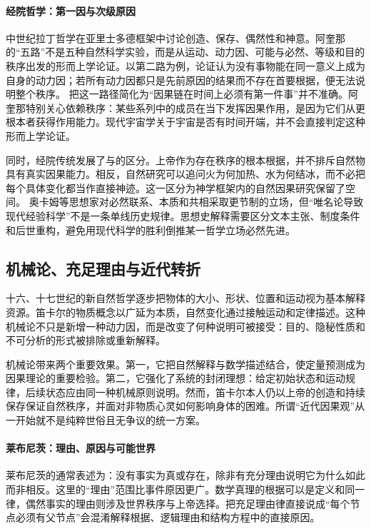 \paragraph{经院哲学：第一因与次级原因}

中世纪拉丁哲学在亚里士多德框架中讨论创造、保存、偶然性和神意。阿奎那的“五路”不是五种自然科学实验，而是从运动、动力因、可能与必然、等级和目的秩序出发的形而上学论证\parencite{aquinasST}。以第二路为例，论证认为没有事物能在同一意义上成为自身的动力因；若所有动力因都只是先前原因的结果而不存在首要根据，便无法说明整个秩序。
把这一路径简化为“因果链在时间上必须有第一件事”并不准确。阿奎那特别关心依赖秩序：某些系列中的成员在当下发挥因果作用，是因为它们从更根本者获得作用能力。现代宇宙学关于宇宙是否有时间开端，并不会直接判定这种形而上学论证。

同时，经院传统发展了与的区分。上帝作为存在秩序的根本根据，并不排斥自然物具有真实因果能力。相反，自然研究可以追问火为何加热、水为何结冰，而不必把每个具体变化都当作直接神迹。这一区分为神学框架内的自然因果研究保留了空间。
奥卡姆等思想家对必然联系、本质和共相采取更节制的立场，但“唯名论导致现代经验科学”不是一条单线历史规律。思想史解释需要区分文本主张、制度条件和后世重构，避免用现代科学的胜利倒推某一哲学立场必然先进。

\subsection{机械论、充足理由与近代转折}

十六、十七世纪的新自然哲学逐步把物体的大小、形状、位置和运动视为基本解释资源。笛卡尔的物质概念以广延为本质，自然变化通过接触运动和定律描述\parencite{descartesPrinciples}。这种机械论不只是新增一种动力因，而是改变了何种说明可被接受：目的、隐秘性质和不可分析的形式被排除或重新解释。

机械论带来两个重要效果。第一，它把自然解释与数学描述结合，使定量预测成为因果理论的重要检验。第二，它强化了系统的封闭理想：给定初始状态和运动规律，后续状态应由同一种机械原则说明。然而，笛卡尔本人仍以上帝的创造和持续保存保证自然秩序，并面对非物质心灵如何影响身体的困难。所谓“近代因果观”从一开始就不是纯粹世俗且无争议的统一方案。

\paragraph{莱布尼茨：理由、原因与可能世界}

莱布尼茨的通常表述为：没有事实为真或存在，除非有充分理由说明它为什么如此而非相反\parencite{leibnizMonadology}。这里的“理由”范围比事件原因更广。数学真理的根据可以是定义和同一律，偶然事实的理由则涉及世界秩序与上帝选择。把充足理由律直接说成“每个节点必须有父节点”会混淆解释根据、逻辑理由和结构方程中的直接原因。

